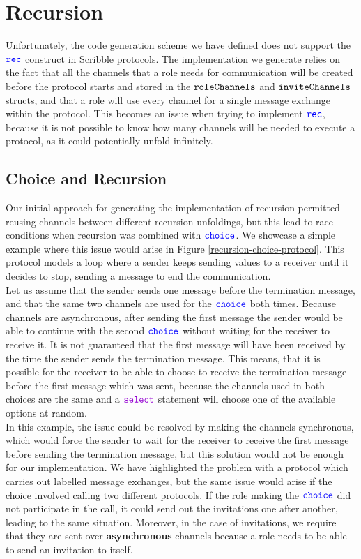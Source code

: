 \documentclass[12pt,twoside]{report}
\begin{document}
\section{Recursion}\label{recursion-limitations}
Unfortunately, the code generation scheme we have defined does not support the ${\color{blue}\mathtt{rec}}$ construct in Scribble protocols. The implementation we generate relies on the fact that all the channels that a role needs for communication will be created before the protocol starts and stored in the ${\mathtt{roleChannels}}$ and ${\mathtt{inviteChannels}}$ structs, and that a role will use every channel for a single message exchange within the protocol. This becomes an issue when trying to implement ${\color{blue}\mathtt{rec}}$, because it is not possible to know how many channels will be needed to execute a protocol, as it could potentially unfold infinitely.


\subsection{Choice and Recursion}
Our initial approach for generating the implementation of recursion permitted reusing channels between different recursion unfoldings, but this lead to race conditions when recursion was combined with ${\color{blue}\mathtt{choice}}$. We showcase a simple example where this issue would arise in Figure \ref{recursion-choice-protocol}. This protocol models a loop where a sender keeps sending values to a receiver until it decides to stop, sending a message to end the communication.\\

Let us assume that the sender sends one message before the termination message, and that the same two channels are used for the ${\color{blue}\mathtt{choice}}$ both times. Because channels are asynchronous, after sending the first message the sender would be able to continue with the second ${\color{blue}\mathtt{choice}}$ without waiting for the receiver to receive it. It is not guaranteed that the first message will have been received by the time the sender sends the termination message. This means, that it is possible for the receiver to be able to choose to receive the termination message before the first message which was sent, because the channels used in both choices are the same and a $\goselect$ statement will choose one of the available options at random.\\

In this example, the issue could be resolved by making the channels synchronous, which would force the sender to wait for the receiver to receive the first message before sending the termination message, but this solution would not be enough for our implementation. We have highlighted the problem with a protocol which carries out labelled message exchanges, but the same issue would arise if the choice involved calling two different protocols. If the role making the ${\color{blue}\mathtt{choice}}$ did not participate in the call, it could send out the invitations one after another, leading to the same situation. Moreover, in the case of invitations, we require that they are sent over \textbf{asynchronous} channels because a role needs to be able to send an invitation to itself. \\
\end{document}
